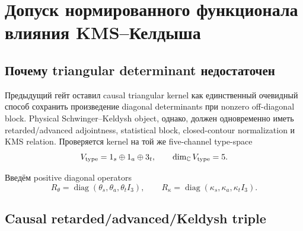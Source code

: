 \chapter{Допуск нормированного функционала влияния KMS--Келдыша}
\label{ch:v9-kms-keldysh-influence-admission}

\section{Почему triangular determinant недостаточен}

Предыдущий гейт оставил causal triangular kernel как единственный
очевидный способ сохранить произведение diagonal determinants при nonzero
off-diagonal block. Physical Schwinger--Keldysh object, однако, должен
одновременно иметь retarded/advanced adjointness, statistical block,
closed-contour normalization и KMS relation. Проверяется kernel на той же
five-channel type-space
\begin{equation}
 V_{\rm type}=1_s\oplus1_a\oplus3_t,
 \qquad \dim_{\mathbb C}V_{\rm type}=5.
 \label{eq:v9-kms-keldysh-type-space}
\end{equation}

Введём positive diagonal operators
\begin{equation}
 R_\theta=\operatorname{diag}(\theta_s,\theta_a,\theta_t I_3),
 \qquad
 R_\kappa=\operatorname{diag}(\kappa_s,\kappa_a,\kappa_t I_3).
 \label{eq:v9-kms-keldysh-type-operators}
\end{equation}

\section{Causal retarded/advanced/Keldysh triple}

